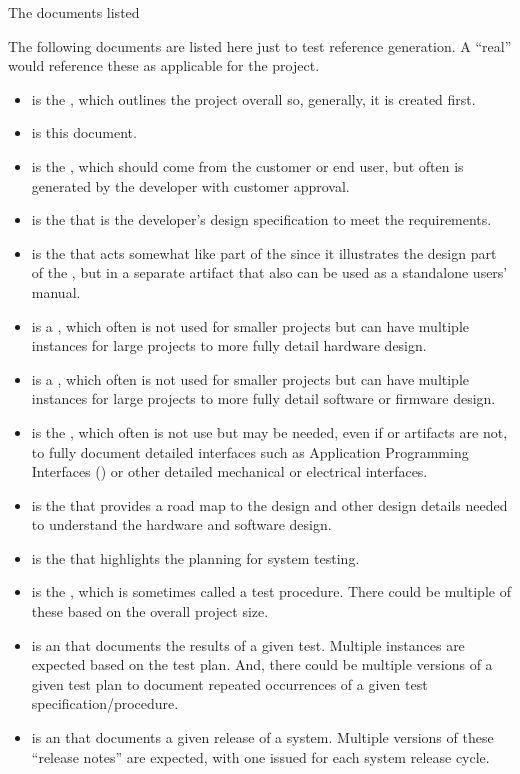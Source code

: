 {The documents listed 

The following documents are listed here just to test reference generation.
A ``real'' \SDP would reference these as applicable for the project.
\begin{itemize}
	\item \citeExProjOCD is the \OCD, which outlines the project overall so, generally, it is created first.
	\item \citeExProjSDP is this document.
	\item \citeExProjSPS is the \SPS, which should come from the customer or end user, but often is generated by the developer with customer approval.
	\item \citeExProjSSS is the \SSS that is the developer's design specification to meet the \SPS requirements.
	\item \citeExProjSUM is the \SUM that acts somewhat like part of the \SSS since it illustrates the \UI design part of the \SSS, but in a separate artifact that also can be used as a standalone users' manual.
	\item \citeExProjHRS is a \HRS, which often is not used for smaller projects but can have multiple instances for large projects to more fully detail hardware design.	
	\item \citeExProjSRS is a \SRS, which often is not used for smaller projects but can have multiple instances for large projects to more fully detail software or firmware design.
	\item \citeExProjIRS is the \IRS, which often is not use but may be needed, even if \HRS or \SRS artifacts are not, to fully document detailed interfaces such as Application Programming Interfaces (\APIs) or other detailed mechanical or electrical interfaces.
	\item \citeExProjSSDD is the \SSDD that provides a road map to the design and other design details needed to understand the hardware and software design.
	\item \citeExProjSTP is the \STP that highlights the planning for system testing.
	\item \citeExProjSTS is the \STS, which is sometimes called a test procedure. There could be multiple of these based on the overall project size.
	\item \citeExProjSTR is an \STR that documents the results of a given test. Multiple instances are expected based on the test plan. And, there could be multiple versions of a given test plan to document repeated occurrences of a given test specification/procedure.
	\item \citeExProjSVD is an \SVD that documents a given release of a system. Multiple versions of these ``release notes'' are expected, with one \SVD issued for each system release cycle.
\end{itemize}



}
